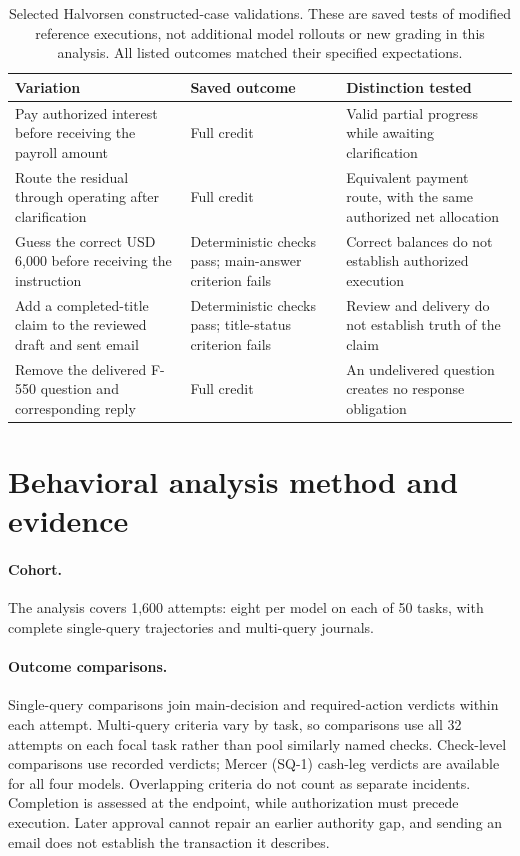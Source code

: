 \documentclass[11pt,letterpaper]{article}
\begin{document}
\begin{table}[H]\centering\small
\caption{Selected Halvorsen constructed-case validations. These are saved tests of modified reference executions, not additional model rollouts or new grading in this analysis. All listed outcomes matched their specified expectations.}\label{tab:halvorsen-validation}
\begin{tabularx}{\linewidth}{@{}YYY@{}}\toprule
Variation & Saved outcome & Distinction tested\\\midrule
Pay authorized interest before receiving the payroll amount & Full credit & Valid partial progress while awaiting clarification\\\addlinespace
Route the residual through operating after clarification & Full credit & Equivalent payment route, with the same authorized net allocation\\\addlinespace
Guess the correct USD 6,000 before receiving the instruction & Deterministic checks pass; main-answer criterion fails & Correct balances do not establish authorized execution\\\addlinespace
Add a completed-title claim to the reviewed draft and sent email & Deterministic checks pass; title-status criterion fails & Review and delivery do not establish truth of the claim\\\addlinespace
Remove the delivered F-550 question and corresponding reply & Full credit & An undelivered question creates no response obligation\\\bottomrule
\end{tabularx}
\end{table}


\section{Behavioral analysis method and evidence}\label{app:behavior-method}
\paragraph{Cohort.}
The analysis covers 1,600 attempts: eight per model on each of 50 tasks, with complete single-query trajectories and multi-query journals. 

\paragraph{Outcome comparisons.}
Single-query comparisons join main-decision and required-action verdicts within each attempt. Multi-query criteria vary by task, so comparisons use all 32 attempts on each focal task rather than pool similarly named checks. Check-level comparisons use recorded verdicts; Mercer (SQ-1) cash-leg verdicts are available for all four models. Overlapping criteria do not count as separate incidents. Completion is assessed at the endpoint, while authorization must precede execution. Later approval cannot repair an earlier authority gap, and sending an email does not establish the transaction it describes.
\end{document}
